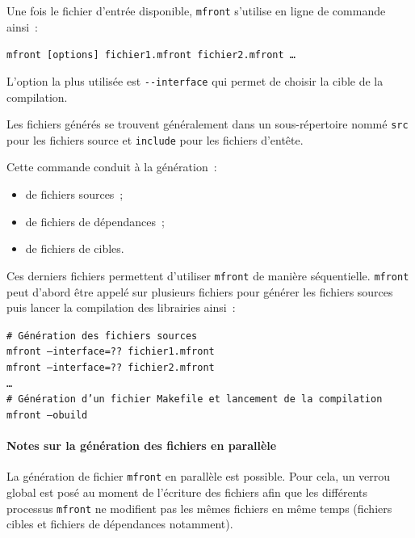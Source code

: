 \documentclass[rectoverso,pleiades,pstricks,leqno,anti]{texmf/note_technique_2010}
\newcommand{\mfront}{\texttt{mfront}}
\newcommand{\moption}[1]{\texttt{-{}-#1}}
\begin{document}
Une fois le fichier d'entrée disponible, \mfront{} s'utilise en ligne
de commande ainsi~:
\begin{center}
  {\tt mfront [options] fichier1.mfront fichier2.mfront \ldots}
\end{center}

L'option la plus utilisée est \moption{interface} qui permet de
choisir la cible de la compilation.

Les fichiers générés se trouvent généralement dans un sous-répertoire
nommé {\tt src} pour les fichiers source et {\tt include} pour les
fichiers d'entête.

Cette commande conduit à la génération~:
\begin{itemize}
  \item de fichiers sources~;
  \item de fichiers de dépendances~;
  \item de fichiers de cibles.
\end{itemize}
Ces derniers fichiers permettent d'utiliser \mfront{} de manière
séquentielle. \mfront{} peut d'abord être appelé sur plusieurs fichiers
pour générer les fichiers sources puis lancer la compilation des
librairies ainsi~:
\begin{center}
  \begin{minipage}{0.6\textwidth}
    \textcolor{ceagrisclair}{\tt \# Génération des fichiers sources}\\
    {\tt mfront --interface=?? fichier1.mfront} \\
    {\tt mfront --interface=?? fichier2.mfront} \\
    {\tt \ldots} \\
    \textcolor{ceagrisclair}{\tt \# Génération d'un fichier Makefile et lancement de la compilation}\\
    {\tt mfront --obuild} \\
  \end{minipage}
\end{center}

\paragraph{Notes sur la génération des fichiers en parallèle} La
génération de fichier \mfront{} en parallèle est possible. Pour cela, un
verrou global est posé au moment de l'écriture des fichiers afin que les
différents processus \mfront{} ne modifient pas les mêmes fichiers en
même temps (fichiers cibles et fichiers de dépendances notamment).
\end{document}
